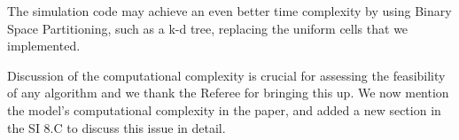 \documentclass[11pt]{article}
\begin{document}
\begin{response}
The simulation code may achieve an even better time complexity by using Binary Space Partitioning, such as a k-d tree, replacing the uniform cells that we implemented.

Discussion of the computational complexity is crucial for assessing the feasibility of any algorithm and we thank the Referee for bringing this up. 
We now mention the model's computational complexity in the paper, and added a new section in the SI 8.C to discuss this issue in detail.  


\end{response}
\end{document}
